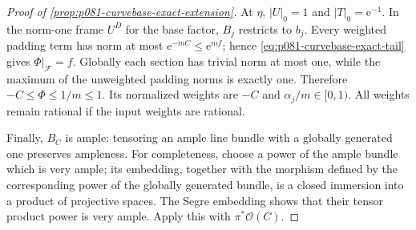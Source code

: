 \begin{proof}[Proof of \cref{prop:p081-curvebase-exact-extension}]
At \(\eta\), \(|U|_0=1\) and \(|T|_0=\mathrm e^{-1}\). In the
norm-one frame \(U^D\) for the base factor, \(B_j\) restricts to \(b_j\).
Every weighted padding term has norm at most
\(\mathrm e^{-mC}\leq\mathrm e^{mf}\); hence
\eqref{eq:p081-curvebase-exact-tail} gives \(\Phi|_{\mathcal F}=f\).
Globally each section has trivial norm at most one, while the maximum
of the unweighted padding norms is exactly one. Therefore
\(-C\leq\Phi\leq1/m\leq1\). Its normalized weights are \(-C\) and
\(\alpha_j/m\in[0,1)\). All weights remain rational if the input
weights are rational.

Finally, \(B_C\) is ample: tensoring an ample line bundle with a
globally generated one preserves ampleness. For completeness, choose
a power of the ample bundle which is very ample; its embedding,
together with the morphism defined by the corresponding power of the
globally generated bundle, is a closed immersion into a product of
projective spaces. The Segre embedding shows that their tensor product
power is very ample. Apply this with \(\pi^*\mathcal O(C)\).
\end{proof}

